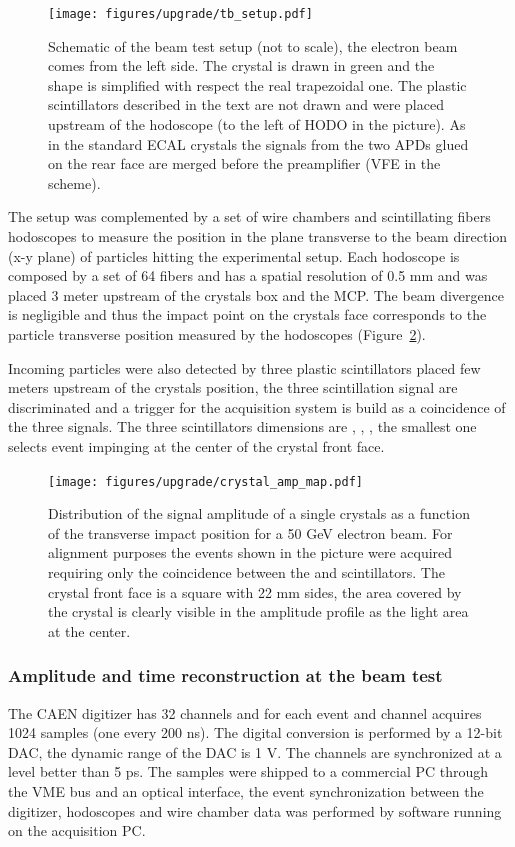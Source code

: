 \begin{figure}[h!]
  \centering
  \texttt{[image: figures/upgrade/tb\_setup.pdf]}
  \caption{Schematic of the beam test setup (not to scale), the electron beam comes from the left side.
    The \PbWO crystal is drawn in green and the shape is simplified with
    respect the real trapezoidal one. The plastic scintillators described in the text are not drawn and were placed
    upstream of the hodoscope (to the left of HODO in the picture). As in the standard ECAL crystals the signals from the two APDs
    glued on the rear face are merged before the preamplifier (VFE in the scheme).}
  \label{fig:tb_setup}
\end{figure}
  
The setup was complemented by a set of wire chambers and scintillating fibers hodoscopes to measure the position in the plane
transverse to the beam direction (x-y plane) of particles hitting the experimental setup.
Each hodoscope is composed by a set of 64 fibers and has a spatial resolution of 0.5 mm and was placed
3 meter upstream of the crystals box and the MCP. The beam divergence is negligible and thus the impact point on the crystals
face corresponds to the particle transverse position measured by the hodoscopes (Figure~\ref{fig:crystal_amp_map}).

Incoming particles were also detected by three plastic scintillators placed few meters upstream of the crystals position, the
three scintillation signal are discriminated and a trigger for the acquisition system is build as a coincidence of the three signals.
The three scintillators dimensions are \sixbysix, \threebythree, \onebyone, the smallest one selects event impinging at the
center of the \twobytwo crystal front face.

\begin{figure}[h!]
  \centering
  \texttt{[image: figures/upgrade/crystal\_amp\_map.pdf]}
  \caption{Distribution of the signal amplitude of a single crystals as a function of the transverse impact position for
    a 50 GeV electron beam. For alignment purposes the events shown in the picture
    were acquired requiring only the coincidence between the \sixbysix and \threebythree scintillators.
    The crystal front face is a square with 22 mm sides, the area covered by the crystal is clearly visible in the amplitude
    profile as the light area at the center.}
  \label{fig:crystal_amp_map}
\end{figure}

\subsubsection{Amplitude and time reconstruction at the beam test}
The CAEN digitizer has 32 channels and for each event and channel acquires 1024 samples (one every 200 ns). The
digital conversion is performed by a 12-bit DAC, the dynamic range of the DAC is 1 V.
The channels are synchronized at a level better than 5 ps.
The samples were shipped to a commercial PC through the VME bus and an optical interface, the event
synchronization between the digitizer, hodoscopes and wire chamber data was performed by software running on the
acquisition PC.

